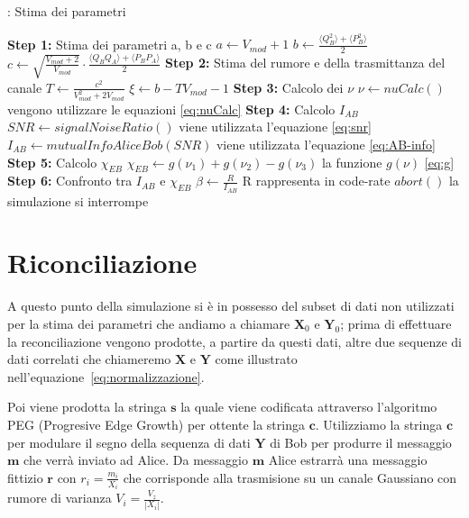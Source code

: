 \begin{algorithm}[H]
\caption{: Stima dei parametri}\label{al:stima-param}
\begin{algorithmic}[1]
\State \textbf{Step 1:} Stima dei parametri a, b e c \newline
	$a \leftarrow V_{mod} + 1$ \newline
	$b \leftarrow \frac{\langle Q_B^2 \rangle + \langle P_B^2\rangle}{2} $ \newline
	$c \leftarrow \sqrt{\frac{V_{mod} + 2}{V_{mod}}} \cdot \frac{\langle Q_BQ_A \rangle + \langle P_BP_A\rangle}{2}$ 
\State \textbf{Step 2:} Stima del rumore e della trasmittanza del canale \newline
	$T \leftarrow \frac{c^2}{V_{mod}^2 + 2 V_{mod}}$ \newline
	$\xi \leftarrow b - TV_{mod} -1 $ 
\State \textbf{Step 3:} Calcolo dei $\nu$ \newline
	$\textbf{$\nu$} \leftarrow nuCalc()$  		 \Comment vengono utilizzare le equazioni \ref{eq:nuCalc}
\State \textbf{Step 4:} Calcolo $I_{AB}$ \newline
	$SNR \leftarrow signalNoiseRatio()$	\Comment viene utilizzata l'equazione \ref{eq:snr}	
	$I_{AB} \leftarrow mutualInfoAliceBob(SNR)$	\Comment viene utilizzata l'equazione \ref{eq:AB-info}
\State \textbf{Step 5:} Calcolo $\chi_{EB}$ \newline
	$\chi_{EB} \leftarrow g(\nu_1) + g(\nu_2) - g(\nu_3)$	\Comment la funzione $g(\nu)$ \ref{eq:g}						
\State \textbf{Step 6:} Confronto tra $I_{AB}$ e $\chi_{EB}$  \newline
	$\beta \leftarrow \frac{R}{I_{AB}}$	\Comment R rappresenta in code-rate
		\State	$abort()$		\Comment la simulazione si interrompe
	\EndIf
\end{algorithmic}
\end{algorithm}


\section{Riconciliazione}
A questo punto della simulazione si \`e in possesso del subset di dati non utilizzati per la stima dei parametri che andiamo a chiamare $\textbf{X}_0$ e $\textbf{Y}_0$; prima di effettuare la reconciliazione vengono prodotte, a partire da questi dati, altre due sequenze di dati correlati che chiameremo $\textbf{X}$ e $\textbf{Y}$ come illustrato nell'equazione~\ref{eq:normalizzazione}. 

Poi viene prodotta la stringa $\textbf{s}$ la quale viene codificata attraverso l'algoritmo PEG (Progresive Edge Growth) per ottente la stringa $\textbf{c}$. Utilizziamo la stringa $\textbf{c}$ per modulare il segno della sequenza di dati $\textbf{Y}$ di Bob per produrre il messaggio  $\textbf{m}$ che verr\`a inviato ad Alice. Da messaggio  $\textbf{m}$ Alice estrarr\`a una messaggio fittizio $\textbf{r}$ con $r_i = \frac{m_i}{X_i}$ che corrisponde alla trasmisione su un canale Gaussiano con rumore di varianza $V_i = \frac{V_z}{|X_i|}$.

